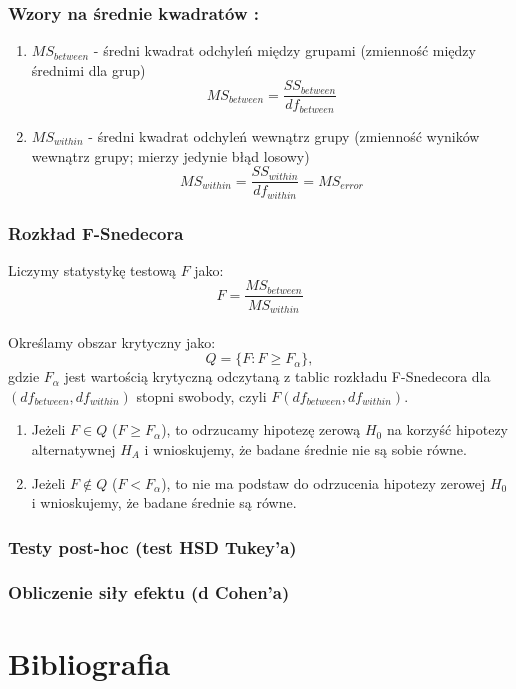 \documentclass[12pt,a4paper]{article}
\begin{document}
\subsubsection{Wzory na średnie kwadratów \cite{witte2010statistics}:}
\begin{enumerate}
    \item $MS_{between}$ - średni kwadrat odchyleń między grupami (zmienność między średnimi dla grup)
    $$MS_{between}=\frac{SS_{between}}{df_{between}}$$
    \item $MS_{within}$ - średni kwadrat odchyleń wewnątrz grupy (zmienność wyników wewnątrz grupy; mierzy jedynie błąd losowy)
    $$MS_{within}=\frac{SS_{within}}{df_{within}}=MS_{error}$$
\end{enumerate}

\newpage
\subsubsection{Rozkład F-Snedecora}
Liczymy statystykę testową $F$ jako:
$$F=\frac{MS_{between}}{MS_{within}}$$
\\
Określamy obszar krytyczny jako:
$$Q=\{F:F\geq F_{\alpha}\},$$
gdzie $F_{\alpha}$ jest wartością krytyczną odczytaną z tablic rozkładu F-Snedecora dla $(df_{between},df_{within})$ stopni swobody, czyli  $F(df_{between},df_{within})$.
\\
\begin{enumerate}
    \item Jeżeli $F\in Q$ ($F\geq F_{\alpha}$), to odrzucamy hipotezę zerową $H_0$ na korzyść hipotezy alternatywnej $H_A$ i wnioskujemy, że badane średnie nie są sobie równe.
    \item Jeżeli $F\not\in Q$ ($F< F_{\alpha}$), to nie ma podstaw do odrzucenia hipotezy zerowej $H_0$ i wnioskujemy, że badane średnie są równe.
\end{enumerate}


\newpage
\subsubsection{Testy post-hoc (test HSD Tukey'a)}

\subsubsection{Obliczenie siły efektu (d Cohen'a)}

\newpage
\section{Bibliografia}


\end{document}
